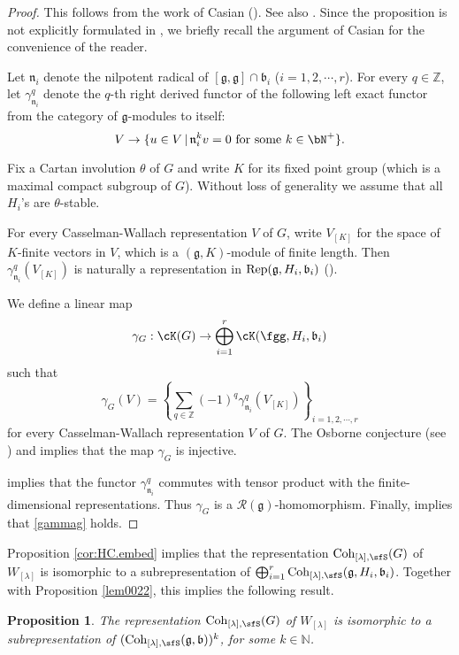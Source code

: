 \documentclass[12pt,a4paper]{amsart}
\newcommand{\BN}{{\mathbb {N}}}
\newcommand{\g}{\mathfrak g}
\renewcommand{\b}{\mathfrak b}
\newcommand{\n}{\mathfrak n}
\newcommand{\Z}{\mathbb{Z}}
\numberwithin{equation}{section}
\newtheorem{prop}[thm]{Proposition}
\theoremstyle{remark}
\def\Coh{\mathrm{Coh}}
\newcommand{\Lam}{{[\lambda]}}
\newcommand{\Grt}{\cK}
\begin{document}
\begin{proof}
This follows from the work of Casian (\cite{Cas}). See also {\cite{Mc}}. Since the proposition is not explicitly formulated in \cite{Cas}, we briefly recall the argument of Casian for the convenience of the reader.



 Let $\n_i$ denote the nilpotent radical of $[\g,\g]\cap \b_i$ ($i=1,2, \cdots,r$).
 For every $q\in \Z$, let $\gamma_{\n_i}^q$ denote the $q$-th right derived functor of the following left exact functor from the category of $\g$-modules to itself:
 \[
   V\rightarrow \{u\in V\,|\, \n_i^k v=0\textrm{ for some $k\in \bN^+$}\}.
 \]

Fix a Cartan involution $\theta$ of $G$ and write $K$ for its fixed point group (which is a maximal compact subgroup of $G$).  Without loss of generality we assume that all $H_i$'s are $\theta$-stable.

For every Casselman-Wallach representation $V$ of $G$, write $V_{[K]}$ for the space of $K$-finite vectors in $V$, which is a $(\g,K)$-module of finite length. Then   $\gamma_{\n_i}^q(V_{[K]})$ is naturally a representation in $\Rep(\g, H_i, \b_i)$ (\cite[Corollary 4.9]{Cas}).

We define a linear map
 \[
\gamma_G: \Grt(G)\rightarrow  \bigoplus_{i=1}^{r} \Grt(\fgg,H_{i},\b_{i})
 \]
 such that
 \[
   \gamma_G(V)= \left\{\sum_{q\in \Z} (-1)^{q} \gamma^{q}_{\n_i}(V_{[K]})\right\}_{i=1,2, \cdots, r}
 \]
for every Casselman-Wallach representation $V$ of $G$. The Osborne conjecture (see \cite[Theorem 3.1]{Cas}) and \cite[Corollary 4.9]{Cas} implies that the map $\gamma_G$ is injective.

\cite[Proposition 4.11]{Cas} implies that the functor $\gamma_{\n_i}^q$ commutes with tensor product with the finite-dimensional representations. Thus $\gamma_G$ is a $\mathcal R(\g)$-homomorphism. Finally, \cite[Corollary 4.15]{Cas} implies that \eqref{gammag} holds.


\end{proof}




Proposition \ref{cor:HC.embed} implies that the representation $\Coh_{\Lam,\sfS}(G)$ of $W_{[\lambda]}$ is isomorphic to a subrepresentation of
$\bigoplus_{i=1}^r \Coh_{\Lam,\sfS}(\g,H_i,\b_i)$. Together with Proposition \ref{lem0022}, this implies the following result.

 \begin{prop}\label{lem22}
The representation $\Coh_{\Lam,\sfS}(G)$ of $W_{[\lambda]}$ is isomorphic to a subrepresentation of $(\Coh_{\Lam,\sfS}(\g,\b))^k$, for some $k\in \BN$.
     \end{prop}
\end{document}
